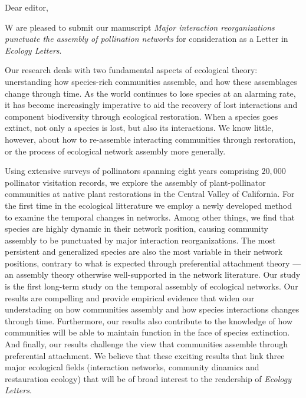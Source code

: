 \documentclass[12pt]{letter}
\begin{document}
\begin{letter}{}

  \opening{Dear editor,}

  W are pleased to submit our manuscript \textit{Major interaction
    reorganizations punctuate the assembly of pollination networks}
  for consideration as a Letter in \textit{Ecology Letters}.

  Our research deals with two fundamental aspects of ecological
  theory: unerstanding how species-rich communities assemble, and how
  these assemblages change through time. As the world continues to
  lose species at an alarming rate, it has become increasingly
  imperative to aid the recovery of lost interactions and component
  biodiversity through ecological restoration. When a species goes
  extinct, not only a species is lost, but also its interactions. We
  know little, however, about how to re-assemble interacting
  communities through restoration, or the process of ecological
  network assembly more generally.

  Using extensive surveys of pollinators spanning eight years
  comprising \texttildelow $20,000$ pollinator visitation records, we
  explore the assembly of plant-pollinator communities at native plant
  restorations in the Central Valley of California. For the first time
  in the ecological litterature we employ a newly developed method to
  examine the temporal changes in networks. Among other things, we
  find that species are highly dynamic in their network position,
  causing community assembly to be punctuated by major interaction
  reorganizations. The most persistent and generalized species are
  also the most variable in their network positions, contrary to what
  is expected through preferential attachment theory --- an assembly
  theory otherwise well-supported in the network literature. Our study
  is the first long-term study on the temporal assembly of ecological
  networks.  Our results are compelling and provide empirical evidence
  that widen our understading on how communities assembly and how
  species interactions changes through time. Furthermore, our results
  also contribute to the knowledge of how communities will be able to
  maintain function in the face of species extinction. And finally,
  our results challenge the view that communities assemble through
  preferential attachment. We believe that these exciting results that
  link three major ecological fields (interaction networks, community
  dinamics and restauration ecology) that will be of broad interest to
  the readership of \textit{Ecology Letters}.


\end{letter}
\end{document}
